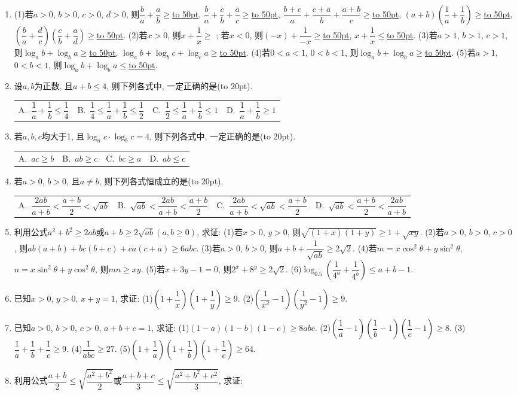 \documentclass[10pt,a4paper]{article}
\newcommand{\blank}[1]{\underline{\hbox to #1pt{}}}
\newcommand{\bracket}[1]{(\hbox to #1pt{})}
\newcommand{\fourch}[4]{\par\begin{tabular}{p{.23\textwidth}p{.23\textwidth}p{.23\textwidth}p{.23\textwidth}}
A.~#1 &B.~#2& C.~#3& D.~#4
\end{tabular}}
\begin{document}
\begin{enumerate}[1.]
    \fourch{1}{2}{3}{4}
    \item (1)若$a>0$, $b>0$, $c>0$, $d>0$, 则$\dfrac ba+\dfrac ab\ge$\blank{50}, $\dfrac ba+\dfrac cb+\dfrac ac\ge$\blank{50}, $\dfrac{b+c}a+\dfrac{c+a}b+\dfrac{a+b}c\ge$\blank{50}, $(a+b)(\dfrac 1a+\dfrac 1b)\ge$\blank{50}, $(\dfrac ba+\dfrac dc)(\dfrac cb+\dfrac ad)\ge$\blank{50}.
    (2)若$x>0$, 则$x+\dfrac 1x\ge$    ;
    若$x<0$, 则$(-x)+\dfrac 1{-x}\ge$\blank{50}, $x+\dfrac 1x\le$\blank{50}.
    (3)若$a>1$, $b>1$, $c>1$, 则$\log_ab+\log_ba\ge$\blank{50}, $\log_ab+\log_bc+\log_ca\ge$\blank{50}.
    (4)若$0<a<1$, $0<b<1$, 则$\log_ab+\log_ba\ge$\blank{50}.
    (5)若$a>1$, $0<b<1$, 则$\log_ab+\log_ba\le$\blank{50}.
    \item 设$a,b$为正数, 且$a+b\le 4$, 则下列各式中, 一定正确的是\bracket{20}.
    \fourch{$\dfrac 1a+\dfrac 1b\le \dfrac 14$}{$\dfrac 14\le \dfrac 1a+\dfrac 1b\le \dfrac 12$}{$\dfrac 12\le \dfrac 1a+\dfrac 1b\le 1$}{$\dfrac 1a+\dfrac 1b\ge 1$}
    \item 若$a,b,c$均大于1, 且$\log_ac\cdot \log_bc=4$, 则下列各式中, 一定正确的是\bracket{20}.
    \fourch{$ac\ge b$}{$ab\ge c$}{$bc\ge a$}{$ab\le c$}
    \item 若$a>0$, $b>0$, 且$a\ne b$, 则下列各式恒成立的是\bracket{20}.
    \fourch{$\dfrac{2ab}{a+b}<\dfrac{a+b}2<\sqrt{ab}$}{$\sqrt{ab}<\dfrac{2ab}{a+b}<\dfrac{a+b}2$}{$\dfrac{2ab}{a+b}<\sqrt{ab}<\dfrac{a+b}2$}{$\sqrt{ab}<\dfrac{a+b}2<\dfrac{2ab}{a+b}$}
    \item 利用公式$a^2+b^2\ge 2ab$或$a+b\ge 2\sqrt{ab}(a,b\ge 0)$, 求证:
    (1)若$x>0$, $y>0$, 则$\sqrt{(1+x)(1+y)}\ge 1+\sqrt{xy}$.
    (2)若$a>0$, $b>0$, $c>0$, 则$ab(a+b)+bc(b+c)+ca(c+a)\ge 6abc$.
    (3)若$a>0$, $b>0$, 则$a+b+\dfrac 1{\sqrt{ab}}\ge 2\sqrt 2$.
    (4)若$m=x{{\cos }^2}\theta +y{{\sin }^2}\theta$, $n=x{{\sin }^2}\theta +y{{\cos }^2}\theta$, 则$mn\ge xy$.
    (5)若$x+3y-1=0$, 则${2^x}+{8^y}\ge 2\sqrt 2$.
    (6)${\log_{0.5}}(\dfrac 1{4^a}+\dfrac 1{4^b})\le a+b-1$.
    \item 已知$x>0$, $y>0$, $x+y=1$, 求证:
    (1)$(1+\dfrac 1x)(1+\dfrac 1y)\ge 9$.		(2)$(\dfrac 1{x^2}-1)(\dfrac 1{y^2}-1)\ge 9$.
    \item 已知$a>0$, $b>0$, $c>0$, $a+b+c=1$, 求证:
    (1)$(1-a)(1-b)(1-c)\ge 8abc$.			(2)$(\dfrac 1a-1)(\dfrac 1b-1)(\dfrac 1c-1)\ge 8$.
    (3)$\dfrac 1a+\dfrac 1b+\dfrac 1c\ge 9$.						(4)$\dfrac 1{abc}\ge 27$.
    (5)$(1+\dfrac 1a)(1+\dfrac 1b)(1+\dfrac 1c)\ge 64$.
    \item 利用公式$\dfrac{a+b}2\le \sqrt{\dfrac{{a^2}+{b^2}}2}$或$\dfrac{a+b+c}3\le \sqrt{\dfrac{{a^2}+{b^2}+{c^2}}3}$, 求证:

\end{enumerate}
\end{document}
